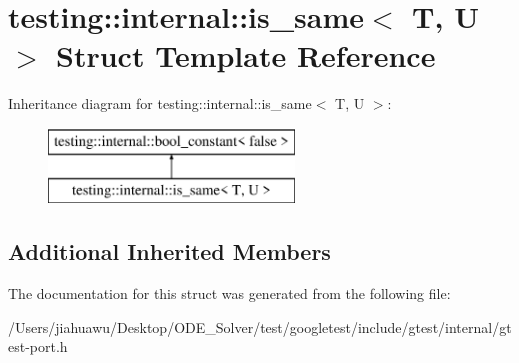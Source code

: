 \hypertarget{structtesting_1_1internal_1_1is__same}{}\section{testing\+:\+:internal\+:\+:is\+\_\+same$<$ T, U $>$ Struct Template Reference}
\label{structtesting_1_1internal_1_1is__same}
Inheritance diagram for testing\+:\+:internal\+:\+:is\+\_\+same$<$ T, U $>$\+:\begin{figure}[H]
\begin{center}
\leavevmode
\includegraphics[height=2.000000cm]{structtesting_1_1internal_1_1is__same}
\end{center}
\end{figure}
\subsection*{Additional Inherited Members}


The documentation for this struct was generated from the following file\+:\begin{DoxyCompactItemize}
\item 
/\+Users/jiahuawu/\+Desktop/\+O\+D\+E\+\_\+\+Solver/test/googletest/include/gtest/internal/gtest-\/port.\+h\end{DoxyCompactItemize}

